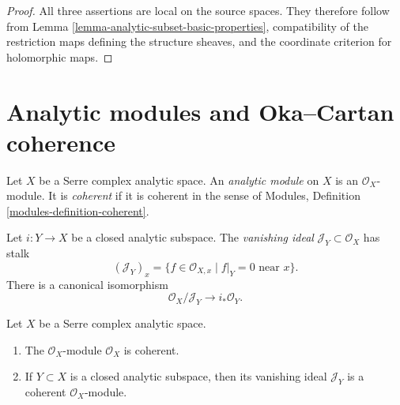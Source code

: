 \begin{proof}
All three assertions are local on the source spaces. They therefore follow
from Lemma \ref{lemma-analytic-subset-basic-properties}, compatibility of the
restriction maps defining the structure sheaves, and the coordinate
criterion for holomorphic maps.
\end{proof}


\section{Analytic modules and Oka--Cartan coherence}
\label{section-analytic-modules}

\begin{definition}
\label{definition-analytic-module}
\begin{reference}
\cite[\S 1, no. 3, p. 5]{GAGA}
\end{reference}
Let $X$ be a Serre complex analytic space. An {\it analytic module} on $X$
is an $\mathcal O_X$-module. It is {\it coherent} if it is coherent in the
sense of Modules, Definition \ref{modules-definition-coherent}.
\end{definition}

\begin{definition}
\label{definition-vanishing-ideal-analytic-subspace}
Let $i:Y\to X$ be a closed analytic subspace. The {\it vanishing ideal}
$\mathcal J_Y\subset\mathcal O_X$ has stalk
$$
(\mathcal J_Y)_x=
\{f\in\mathcal O_{X,x}\mid f|_Y=0\text{ near }x\}.
$$
There is a canonical isomorphism
$$
\mathcal O_X/\mathcal J_Y \longrightarrow i_*\mathcal O_Y.
$$
\end{definition}

\begin{theorem}
\label{theorem-oka-cartan-coherence}
\begin{reference}
\cite[\S 1, Proposition 1, pp. 5--6]{GAGA}
\end{reference}
Let $X$ be a Serre complex analytic space.
\begin{enumerate}
\item The $\mathcal O_X$-module $\mathcal O_X$ is coherent.
\item If $Y\subset X$ is a closed analytic subspace, then its vanishing
ideal $\mathcal J_Y$ is a coherent $\mathcal O_X$-module.
\end{enumerate}
\end{theorem}

